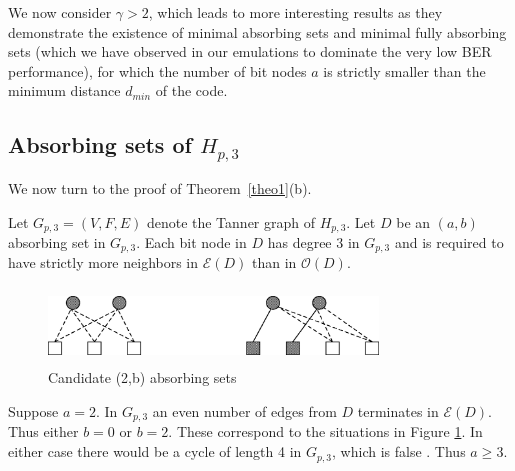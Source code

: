 We now consider $\gamma
> 2$, which leads to more interesting results as they demonstrate the
existence of minimal absorbing sets and minimal fully absorbing
sets (which we have observed in our emulations to dominate the
very low BER performance), for which the number of bit nodes $a$
is strictly smaller than the minimum distance $d_{min}$ of the
code.

\subsection{Absorbing sets of $H_{p,3}$}\label{theo12}

We now turn to the proof of Theorem~\ref{theo1}(b).


Let $G_{p,3}=(V,F,E)$ denote the Tanner graph of $H_{p,3}$. Let
$D$ be an $(a,b)$ absorbing set in $G_{p,3}$. Each bit node in $D$
has degree $3$ in $G_{p,3}$ and is required to have strictly more
neighbors in $\mathcal{E}(D)$ than in $\mathcal{O}(D)$.

\begin{figure}
\center\includegraphics[width=3.45in,height=0.8in]{fig07.eps}
\caption{Candidate (2,b) absorbing sets}\label{Fig07}
\end{figure}
Suppose $a=2$. In $G_{p,3}$ an even number of edges from $D$
terminates in $\mathcal{E}(D)$. Thus either $b=0$ or $b=2$. These
correspond to the situations in Figure \ref{Fig07}. In either case
there would be a cycle of length 4 in $G_{p,3}$, which is false
\cite{fan}. Thus $a\geq 3$.

